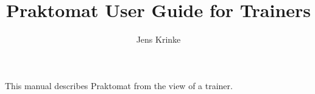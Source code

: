 \documentclass{article}
\begin{document}
\title{Praktomat User Guide for Trainers}
\author{Jens Krinke}
\maketitle

This manual describes Praktomat from the view of a trainer.

\tableofcontents


\end{document}
